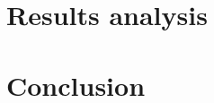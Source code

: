 \documentclass[english,master,unicode]{ctufit-thesis}
\theoremstyle{plain}
\theoremstyle{definition}
\theoremstyle{remark}
\numberwithin{theorem}{chapter}
\begin{document}
\chapter{Results analysis}

\chapter{Conclusion}


\appendix\appendixinit



\backmatter
\printbibliography



\end{document}
